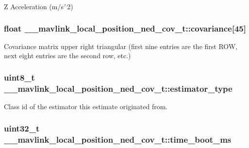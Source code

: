 Z Acceleration (m/s$^\wedge$2) 

\hypertarget{struct____mavlink__local__position__ned__cov__t_a1a3f2cad3f1c5d6d3743df679ac58065}{
\subsubsection[{covariance}]{\setlength{\rightskip}{0pt plus 5cm}float \+\_\+\+\_\+mavlink\+\_\+local\+\_\+position\+\_\+ned\+\_\+cov\+\_\+t\+::covariance\mbox{[}45\mbox{]}}}\label{struct____mavlink__local__position__ned__cov__t_a1a3f2cad3f1c5d6d3743df679ac58065}


Covariance matrix upper right triangular (first nine entries are the first R\+O\+W, next eight entries are the second row, etc.) 

\hypertarget{struct____mavlink__local__position__ned__cov__t_a3274375eddf426c96cf6716d9080226f}{
\subsubsection[{estimator\+\_\+type}]{\setlength{\rightskip}{0pt plus 5cm}uint8\+\_\+t \+\_\+\+\_\+mavlink\+\_\+local\+\_\+position\+\_\+ned\+\_\+cov\+\_\+t\+::estimator\+\_\+type}}\label{struct____mavlink__local__position__ned__cov__t_a3274375eddf426c96cf6716d9080226f}


Class id of the estimator this estimate originated from. 

\hypertarget{struct____mavlink__local__position__ned__cov__t_a624f9a7b76c76c4519d2181884acfdc9}{
\subsubsection[{time\+\_\+boot\+\_\+ms}]{\setlength{\rightskip}{0pt plus 5cm}uint32\+\_\+t \+\_\+\+\_\+mavlink\+\_\+local\+\_\+position\+\_\+ned\+\_\+cov\+\_\+t\+::time\+\_\+boot\+\_\+ms}}\label{struct____mavlink__local__position__ned__cov__t_a624f9a7b76c76c4519d2181884acfdc9}


